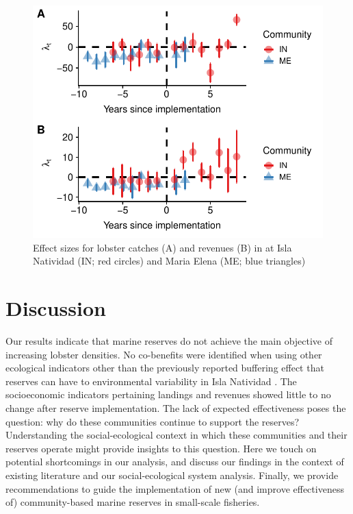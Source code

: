 \documentclass{frontiersSCNS}
\begin{document}
\begin{figure}
\centering
\includegraphics{Villasenor-Derbez_files/figure-latex/unnamed-chunk-6-1.pdf}
\caption{\label{fig:unnamed-chunk-6}\label{fig:lobsters}Effect sizes for
lobster catches (A) and revenues (B) in at Isla Natividad (IN; red
circles) and Maria Elena (ME; blue triangles)}
\end{figure}

\clearpage

\section{Discussion}\label{discussion}

Our results indicate that marine reserves do not achieve the main
objective of increasing lobster densities. No co-benefits were
identified when using other ecological indicators other than the
previously reported buffering effect that reserves can have to
environmental variability in Isla Natividad \citep{micheli_2012-EU}. The
socioeconomic indicators pertaining landings and revenues showed little
to no change after reserve implementation. The lack of expected
effectiveness poses the question: why do these communities continue to
support the reserves? Understanding the social-ecological context in
which these communities and their reserves operate might provide
insights to this question. Here we touch on potential shortcomings in
our analysis, and discuss our findings in the context of existing
literature and our social-ecological system analysis. Finally, we
provide recommendations to guide the implementation of new (and improve
effectiveness of) community-based marine reserves in small-scale
fisheries.
\end{document}
